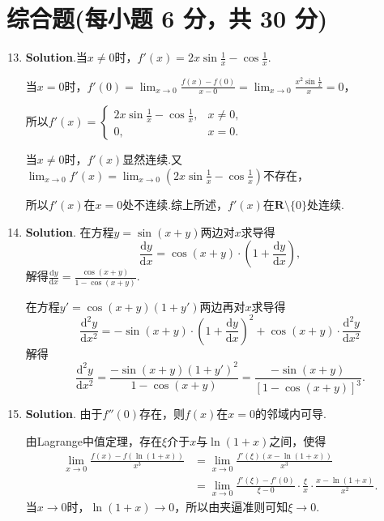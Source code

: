 \documentclass[../main.tex]{subfiles}
\begin{document}
\section{综合题(每小题 6 分，共 30 分)}
\begin{enumerate}
    \setcounter{enumi}{12}
    \item \textbf{Solution}.当$x\neq0$时，$f'(x)=2x\sin\frac{1}{x}-\cos\frac{1}{x}$.

          当$x=0$时，$f'(0)=\lim_{x\to0}\frac{f(x)-f(0)}{x-0}=\lim_{x\to0}\frac{x^{2}\sin\frac{1}{x}}{x}
              =0$，

          所以$f'(x)=
              \begin{cases}
                  2x\sin\frac{1}{x}-\cos\frac{1}{x}, & x\neq0, \\
                  0,                                 & x=0.
              \end{cases}$

          当$x\neq0$时，$f'(x)$显然连续.又$\lim_{x\to0}f'(x)=\lim_{x\to0}\left(2x\sin
              \frac{1}{x}-\cos\frac{1}{x}\right)$不存在，

          所以$f'(x)$在$x=0$处不连续.综上所述，$f'(x)$在$\mathbf{R}\setminus\{0\}$处连续.

    \item \textbf{Solution}. 在方程$y=\sin(x+y)$两边对$x$求导得
          \[
              \frac{\mathrm{d}y}{\mathrm{d}x}=\cos(x+y)\cdot\left(1+\frac{\mathrm{d}y}{\mathrm{d}x}
              \right),
          \]
          解得$\frac{\mathrm{d}y}{\mathrm{d}x}=\frac{\cos(x+y)}{1-\cos(x+y)}$.

          在方程$y'=\cos(x+y)(1+y')$两边再对$x$求导得
          \[
              \frac{\mathrm{d}^{2}y}{\mathrm{d}x^{2}}= -\sin(x+y)\cdot\left(1+\frac{\mathrm{d}y}{\mathrm{d}x}
              \right)^{2}+\cos(x+y)\cdot\frac{\mathrm{d}^{2}y}{\mathrm{d}x^{2}}
          \]
          解得
          \[
              \frac{\mathrm{d}^{2}y}{\mathrm{d}x^{2}}=\frac{-\sin(x+y)(1+y')^{2}}{1-\cos(x+y)}
              =\frac{-\sin(x+y)}{[1-\cos(x+y)]^{3}}.
          \]

    \item \textbf{Solution}. 由于$f''(0)$存在，则$f(x)$在$x=0$的邻域内可导.

          由Lagrange中值定理，存在$\xi$介于$x$与$\ln(1+x)$之间，使得
          \[
              \begin{aligned}
                  \lim_{x\to0}\frac{f(x)-f(\ln(1+x))}{x^3} & =\lim_{x\to0}\frac{f'(\xi)(x-\ln(1+x))}{x^3}                                           \\
                                                           & =\lim_{x\to0}\frac{f'(\xi)-f'(0)}{\xi-0}\cdot\frac{\xi}{x}\cdot\frac{x-\ln(1+x)}{x^2}.
              \end{aligned}
          \]
          当$x\to0$时，$\ln(1+x)\to0$，所以由夹逼准则可知$\xi\to0$.


\end{enumerate}
\end{document}
